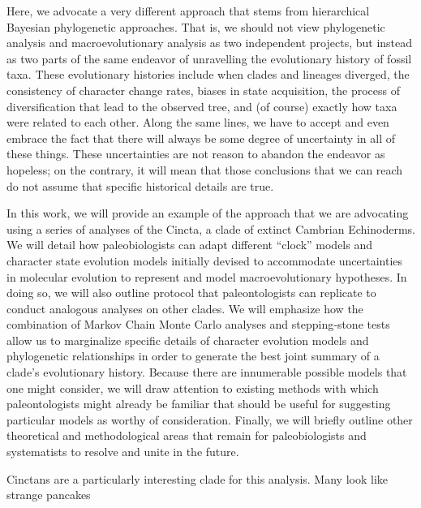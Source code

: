 \documentclass{article}
\begin{document}
Here, we advocate a very different approach that stems from hierarchical Bayesian phylogenetic approaches.  
That is, we should not view phylogenetic analysis and macroevolutionary analysis as two independent projects, but instead as two parts of the same endeavor of unravelling the evolutionary history of fossil taxa.  
These evolutionary histories include when clades and lineages diverged, the consistency of character change rates, biases in state acquisition, the process of diversification that lead to the observed tree, and (of course) exactly how taxa were related to each other.  
Along the same lines, we have to accept and even embrace the fact that there will always be some degree of uncertainty in all of these things.  
These uncertainties are not reason to abandon the endeavor as hopeless; on the contrary, it will mean that those conclusions that we can reach do not assume that specific historical details are true.  

In this work, we will provide an example of the approach that we are advocating using a series of analyses of the Cincta, a clade of extinct Cambrian Echinoderms. 
We will detail how paleobiologists can adapt different “clock” models and character state evolution models initially devised to accommodate uncertainties in molecular evolution to represent and model macroevolutionary hypotheses.  
In doing so, we will also outline protocol that paleontologists can replicate to conduct analogous analyses on other clades.  
We will emphasize how the combination of Markov Chain Monte Carlo analyses and stepping‑stone tests allow us to marginalize specific details of character evolution models and phylogenetic relationships in order to generate the best joint summary of a clade’s evolutionary history.  
Because there are innumerable possible models that one might consider, we will draw attention to existing methods with which paleontologists might already be familiar that should be useful for suggesting particular models as worthy of consideration.  
Finally, we will briefly outline other theoretical and methodological areas that remain for paleobiologists and systematists to resolve and unite in the future. 

Cinctans are a particularly interesting clade for this analysis.
Many look like strange pancakes 
\end{document}
